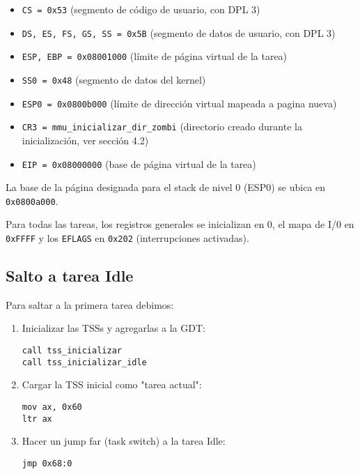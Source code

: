	\begin{itemize}
		\item \texttt{CS = 0x53} (segmento de código de usuario, con DPL 3)

		\item \texttt{DS, ES, FS, GS, SS = 0x5B} (segmento de datos de usuario, con DPL 3)

		\item \texttt{ESP, EBP = 0x08001000} (límite de página virtual de la tarea)

		\item \texttt{SS0 = 0x48} (segmento de datos del kernel)

		\item \texttt{ESP0 = 0x0800b000} (límite de dirección virtual mapeada a pagina nueva)

		\item \texttt{CR3 = mmu\_inicializar\_dir\_zombi} (directorio creado durante la inicialización, ver sección 4.2)

		\item \texttt{EIP = 0x08000000} (base de página virtual de la tarea)

	\end{itemize}

	La base de la página designada para el stack de nivel 0 (ESP0) se ubica en \texttt{0x0800a000}.

	Para todas las tareas, los registros generales se inicializan en 0, el mapa de I/0 en \texttt{0xFFFF} y los \texttt{EFLAGS} en \texttt{0x202} (interrupciones activadas).

	\subsection{Salto a tarea Idle}

	Para saltar a la primera tarea debimos:

	\lstset{escapechar=@,style=asm}
	\begin{enumerate}

		\item Inicializar las TSSs y agregarlas a la GDT:

		\begin{lstlisting}
call tss_inicializar
call tss_inicializar_idle
		\end{lstlisting}

		\item Cargar la TSS inicial como "tarea actual":

		\begin{lstlisting}
mov ax, 0x60
ltr ax
		\end{lstlisting}

		\item Hacer un jump far (task switch) a la tarea Idle:

		\begin{lstlisting}
jmp 0x68:0
		\end{lstlisting}

	\end{enumerate}